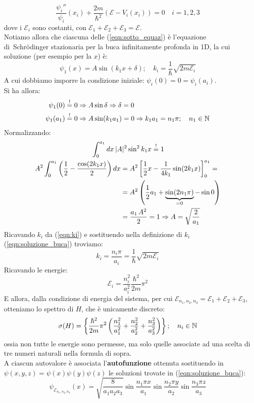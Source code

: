 \documentclass[../../FisicaTeorica.tex]{subfiles}
\begin{document}
\begin{equation}
\frac{\psi_i''}{\psi_i}(x_i)+\frac{2m}{\hbar^2}(\mathcal{E}-V_i(x_i))=0\quad i=1,2,3
\label{eqn:sotto_equaz}
\end{equation}
dove i $\mathcal{E}_i$ sono costanti, con $\mathcal{E}_1+\mathcal{E}_2 +\mathcal{E}_3 = \mathcal{E}$.\\
Notiamo allora che ciascuna delle (\ref{eqn:sotto_equaz}) è l'equazione di\ Schrödinger stazionaria per la buca infinitamente profonda in 1D, la cui soluzione (per esempio per la $x$) è:
\begin{equation}
\psi_1(x)=A\sin(k_1 x+\delta);\quad k_i = \frac{1}{\hbar}\sqrt{2m\mathcal{E}_i}
\label{eqn:soluzione_buca}
\end{equation}
A cui dobbiamo imporre la condizione iniziale: $\psi_i(0)=0=\psi_i(a_i)$.\\
Si ha allora:
\begin{align}
    \nonumber \psi_1(0) &\overset{!}{=} 0 \Rightarrow A\sin\delta\Rightarrow \delta=0\\
    \psi_1(a_1) &\overset{!}{=} 0 \Rightarrow A\sin(k_1 a_1) = 0 \Rightarrow k_1 a_1 = n_1 \pi; \quad n_1 \in \mathbb{N}
    \label{eqn:ki}
\end{align}
Normalizzando:
\begin{align*}
\span \int_0^{a_1} dx\,|A|^2 \sin^2 k_1 x \overset{!}{=} 1\\
A^2 \int_0^{a_1} \left(\frac{1}{2}-\frac{\cos(2k_1 x)}{2}\right)dx &= A^2 \left[
\frac{1}{2}x-\frac{1}{4k_1}\sin(2k_1 x)
\right ]_0^{a_1} = \\
&= A^2\left(\frac{1}{2}a_1 + \underbrace{\sin(2n_1\pi)}_{=0} -\sin 0\right )\\ & =  \frac{a_1\, A^2}{2} = 1 \Rightarrow A=\sqrt{\frac{2}{a_1}}
\end{align*}
Ricavando $k_i$ da (\ref{eqn:ki}) e sostituendo nella definizione di $k_i$ (\ref{eqn:soluzione_buca}) troviamo:
\[
k_i = \frac{n_i \pi}{a_i} = \frac{1}{\hbar}\sqrt{2m\mathcal{E}_i}
\]
Ricavando le energie:
\[
\mathcal{E}_i = \frac{n_i^2}{a_i^2}\frac{\hbar^2}{2m}\pi^2
\]
E allora, dalla condizione di energia del sistema, per cui $\mathcal{E}_{n_1,n_2,n_3}=\mathcal{E}_1+\mathcal{E}_2+\mathcal{E}_3$, otteniamo lo spettro di $H$, che è unicamente discreto:
\[
\sigma(H)=\left \{
\frac{\hbar^2}{2m}\pi^2 \left(\frac{n_1^2}{a_1^2}+\frac{n_2^2}{a_2^2}+\frac{n_3^2}{a_3^2}\right)
\right \}; \quad n_i \in \mathbb{N}
\]
ossia non tutte le energie sono permesse, ma solo quelle associate ad una scelta di tre numeri naturali nella formula di sopra.\\
A ciascun autovalore è associata l'\textbf{autofunzione} ottenuta sostituendo in $\psi(x,y,z)=\psi(x)\psi(y)\psi(z)$ le soluzioni trovate in (\ref{eqn:soluzione_buca}):
\[
\psi_{\mathcal{E}_{n_1,n_2,n_3}}(x)=\sqrt{\frac{8}{a_1 a_2 a_3}}\sin \frac{n_1 \pi x}{a_1}\sin \frac{n_2 \pi y}{a_2}\sin \frac{n_3 \pi z }{a_3}
\]
\end{document}
